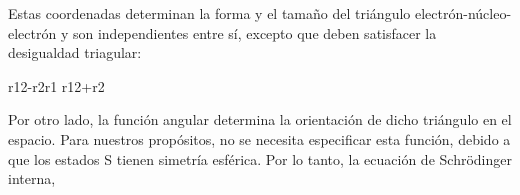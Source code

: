 \documentclass{article}
\begin{document}
Estas coordenadas determinan la forma y el tamaño del triángulo
electrón-núcleo-electrón y son independientes entre sí, excepto 
que deben satisfacer la desigualdad triagular:\newline

\begin{center}
\mid r12-r2\mid \leqslant r1 \leqslant r12+r2 
\end{center} \newline

Por otro lado, la función angular determina la orientación de 
dicho triángulo en el espacio. Para nuestros propósitos, no se 
necesita especificar esta función, debido a que los estados S 
tienen simetría esférica. Por lo tanto, la ecuación de Schrödinger
interna,\newline

\begin{center}

\end{center}
\end{document}
